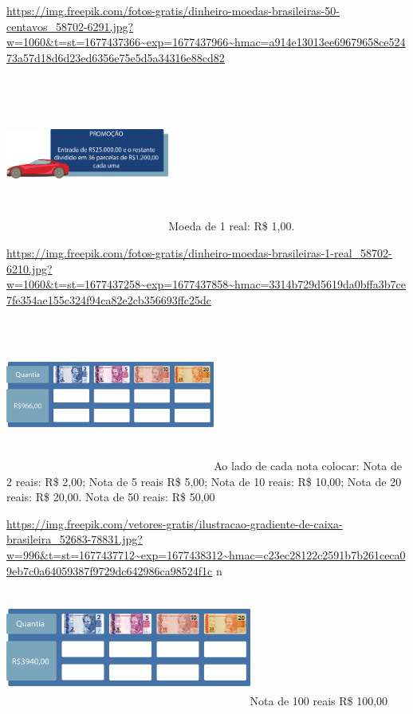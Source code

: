 \url{https://img.freepik.com/fotos-gratis/dinheiro-moedas-brasileiras-50-centavos_58702-6291.jpg?w=1060\&t=st=1677437366~exp=1677437966~hmac=a914e13013ee69679658ce52473a57d18d6d23ed6356e75e5d5a34316e88cd82}

\includegraphics[width=2.11667in,height=2.01180in]{media/image68.png}Moeda
de 1 real: R\$ 1,00.

\url{https://img.freepik.com/fotos-gratis/dinheiro-moedas-brasileiras-1-real_58702-6210.jpg?w=1060\&t=st=1677437258~exp=1677437858~hmac=3314b729d5619da0bffa3b7ce7fe354ae155c324f94ca82e2cb356693ffc25dc}

\includegraphics[width=2.71068in,height=1.97500in]{media/image69.png}Ao
lado de cada nota colocar: Nota de 2 reais: R\$ 2,00; Nota de 5 reais
R\$ 5,00; Nota de 10 reais: R\$ 10,00; Nota de 20 reais: R\$ 20,00. Nota
de 50 reais: R\$ 50,00

\url{https://img.freepik.com/vetores-gratis/ilustracao-gradiente-de-caixa-brasileira_52683-78831.jpg?w=996\&t=st=1677437712~exp=1677438312~hmac=c23ec28122c2591b7b261ceca09eb7c0a64059387f9729dc642986ca98524f1c}
n

\includegraphics[width=3.18285in,height=1.50833in]{media/image70.png}Nota
de 100 reais R\$ 100,00

